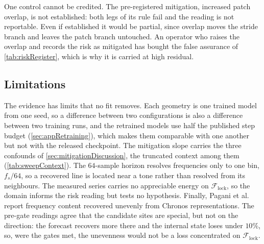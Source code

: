 One control cannot be credited. The pre-registered mitigation, increased patch overlap, is not established: both legs of its rule fail and the reading is not reportable. Even if established it would be partial, since overlap moves the stride branch and leaves the patch branch untouched. An operator who raises the overlap and records the risk as mitigated has bought the false assurance of \autoref{tab:riskRegister}, which is why it is carried at high residual.
\endgroup

\subsection{Limitations}\label{sec:limitations}
The evidence has limits that no fit removes. Each geometry is one trained model from one seed, so a difference between two configurations is also a difference between two training runs, and the retrained models use half the published step budget (\autoref{sec:appRetraining}), which makes them comparable with one another but not with the released checkpoint. The mitigation slope carries the three confounds of \autoref{sec:mitigationDiscussion}, the truncated context among them (\autoref{tab:sweepContext}). The $64$-sample horizon resolves frequencies only to one bin, $f_s/64$, so a recovered line is located near a tone rather than resolved from its neighbours. The measured series carries no appreciable energy on $\mathcal F_{\mathrm{lock}}$, so the domain informs the risk reading but tests no hypothesis. Finally, Pagani et al. report frequency content recovered unevenly from Chronos representations. The pre-gate readings agree that the candidate sites are special, but not on the direction: the forecast recovers more there and the internal state loses under $10\%$, so, were the gates met, the unevenness would not be a loss concentrated on $\mathcal F_{\mathrm{lock}}$.

